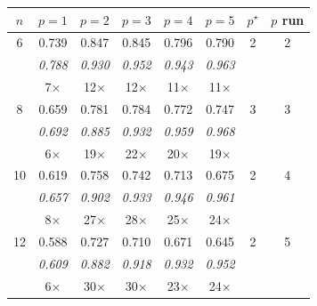\begin{tabular}{cccccccc}
$n$ & $p=1$ & $p=2$ & $p=3$ & $p=4$ & $p=5$ & $p^\star$ & $p$ run \\
\hline
6 & 0.739 & 0.847 & 0.845 & 0.796 & 0.790 & 2 & 2 \\
& \textit{0.788} & \textit{0.930} & \textit{0.952} & \textit{0.943} & \textit{0.963} & & \\
& \small{7$\times$} & \small{12$\times$} & \small{12$\times$} & \small{11$\times$} & \small{11$\times$} & & \\[3pt]
8 & 0.659 & 0.781 & 0.784 & 0.772 & 0.747 & 3 & 3 \\
& \textit{0.692} & \textit{0.885} & \textit{0.932} & \textit{0.959} & \textit{0.968} & & \\
& \small{6$\times$} & \small{19$\times$} & \small{22$\times$} & \small{20$\times$} & \small{19$\times$} & & \\[3pt]
10 & 0.619 & 0.758 & 0.742 & 0.713 & 0.675 & 2 & 4 \\
& \textit{0.657} & \textit{0.902} & \textit{0.933} & \textit{0.946} & \textit{0.961} & & \\
& \small{8$\times$} & \small{27$\times$} & \small{28$\times$} & \small{25$\times$} & \small{24$\times$} & & \\[3pt]
12 & 0.588 & 0.727 & 0.710 & 0.671 & 0.645 & 2 & 5 \\
& \textit{0.609} & \textit{0.882} & \textit{0.918} & \textit{0.932} & \textit{0.952} & & \\
& \small{6$\times$} & \small{30$\times$} & \small{30$\times$} & \small{23$\times$} & \small{24$\times$} & & \\[3pt]
\end{tabular}